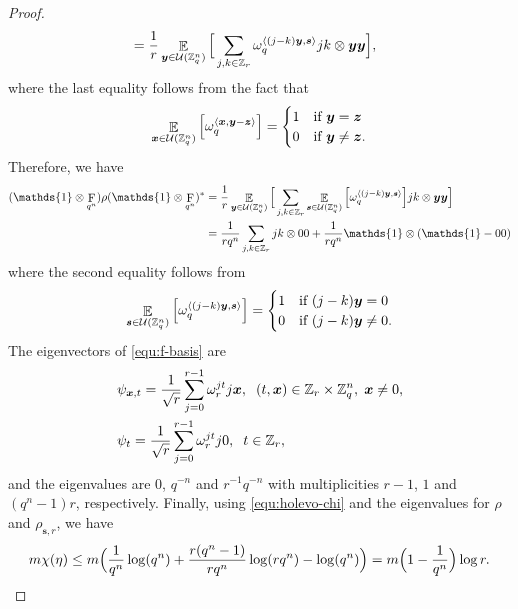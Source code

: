 \documentclass[11pt]{article}
\theoremstyle{plain}
\theoremstyle{definition}
\DeclareMathOperator{\qft}{F}
\DeclareMathOperator{\E}{\mathbb{E}}
\let\ket\relax
\DeclarePairedDelimiter{\ket}{\lvert}{\rangle}
\let\bra\relax
\DeclarePairedDelimiter{\bra}{\langle}{\rvert}
\DeclarePairedDelimiter{\lrang}{\langle}{\rangle}
\def\Z{\mathbb{Z}}
\def\U{\mathcal{U}}
\begin{document}
\begin{proof}
\begin{align*}
        & = \frac{1}{r} \E_{\bm{y} \in \U(\Z_q^n)} \Big[ \sum_{j, k \in \Z_r} \omega_q^{\lrang{(j - k)\bm{y}, \bm{s}}} \ket{j}\bra{k} \otimes \ket{\bm{y}}\bra{\bm{y}} \Big],
    \end{align*}
    where the last equality follows from the fact that
    \[
    \E_{\bm{x} \in \U(\Z_q^n)} \Big[ \omega_q^{\lrang{\bm{x}, \bm{y} - \bm{z}}} \Big] =
    \begin{cases}
        1 & \text{if } \bm{y} = \bm{z} \\
        0 & \text{if } \bm{y} \ne \bm{z}.
    \end{cases}
    \]
    Therefore, we have 
    \begin{align}
        (\mathds{1} \otimes \qft_{q^n}) \rho (\mathds{1} \otimes \qft_{q^n})^*
        & = \frac{1}{r} \E_{\bm{y} \in \U(\Z_q^n)} \Big[ \sum_{j, k \in \Z_r} \E_{\bm{s} \in \U(\Z_q^n)} \Big[ \omega_q^{\lrang{(j - k)\bm{y}, \bm{s}}} \Big] \ket{j}\bra{k} \otimes \ket{\bm{y}}\bra{\bm{y}} \Big] \nonumber \\
        & = \frac{1}{rq^n} \sum_{j, k \in \Z_r} \ket{j}\bra{k} \otimes \ket{0}\bra{0} + \frac{1}{rq^n} \mathds{1} \otimes (\mathds{1} - \ket{0}\bra{0}) \label{equ:f-basis}
    \end{align}
    where the second equality follows from
    \[
    \E_{\bm{s} \in \U(\Z_q^n)} \Big[ \omega_q^{\lrang{(j - k)\bm{y}, \bm{s}}} \Big] = 
    \begin{cases}
        1 & \text{if } (j - k)\bm{y} = 0 \\
        0 & \text{if } (j - k)\bm{y} \ne 0.
    \end{cases}
    \]
    The eigenvectors of \eqref{equ:f-basis} are
    \begin{align*}
        & \ket{\psi_{\bm{x}, t}} = \frac{1}{\sqrt{r}} \sum_{j = 0}^{r - 1} \omega_r^{jt} \ket{j}\ket{\bm{x}}, \hspace*{2mm} (t, \bm{x}) \in \Z_r \times \Z_q^n, \hspace*{1mm} \bm{x} \ne 0, \\
        & \ket{\psi_t} = \frac{1}{\sqrt{r}} \sum_{j = 0}^{r - 1} \omega_r^{jt} \ket{j}\ket{0}, \hspace*{2mm} t \in \Z_r,
    \end{align*}
    and the eigenvalues are $0$, $q^{-n}$ and $r^{-1}q^{-n}$ with multiplicities $r - 1$, $1$ and $(q^n - 1)r$, respectively. Finally, using \eqref{equ:holevo-chi} and the eigenvalues for $\rho$ and $\rho_{\bm{s}, r}$, we have
    \[ m\chi(\eta) \le m\Big( \frac{1}{q^n}\log(q^n) + \frac{r(q^n - 1)}{rq^n}\log(rq^n) - \log(q^n) \Big) = m\Big( 1 - \frac{1}{q^n} \Big)\log r. \qedhere \]
\end{proof}
\end{document}

